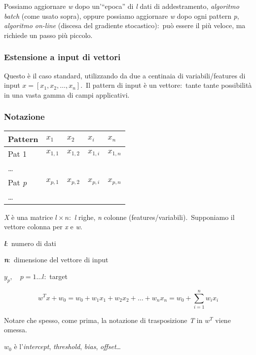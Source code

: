 \noindent Possiamo aggiornare \textit{w} dopo un'``epoca'' di \textit{l} dati di addestramento, \textit{algoritmo batch} (come usato sopra), oppure possiamo aggiornare \textit{w} dopo ogni pattern \textit{p}, \textit{algoritmo on-line} (discesa del gradiente stocastico):\ può essere il più veloce, ma richiede un passo più piccolo.\

\subsubsection{Estensione a input di vettori}

Questo è il caso standard, utilizzando da due a centinaia di variabili{\slash}features di input $x = [x_1, x_2, \dots, x_n]$.\
Il pattern di input è un vettore:\ tante tante possibilità in una vasta gamma di campi applicativi.\

\subsubsection{Notazione}

\begin{table}[H]
	\centering
	\begin{tabular}{|l||l|l|l|l|}
		\hline
		Pattern        & $x_1$     & $x_2$     & $x_i$     & $x_n$     \\\hline\hline
		Pat 1          & $x_{1,1}$ & $x_{1,2}$ & $x_{1,i}$ & $x_{1,n}$ \\\hline
		\dots          &           &           &           &           \\\hline
		Pat \textit{p} & $x_{p,1}$ & $x_{p,2}$ & $x_{p,i}$ & $x_{p,n}$ \\\hline
		\dots          &           &           &           &           \\\hline
	\end{tabular}
\end{table}

\textit{X} è una matrice $l \times n$:\ \textit{l} righe, \textit{n} colonne (features/variabili).\
Supponiamo il vettore colonna per \textit{x} e \textit{w}.\

\begin{flushleft}
	\textbf{\textit{l}}:\ numero di dati

	\textbf{\textit{n}}:\ dimensione del vettore di input

	$y_p, \quad p = 1\dots l$:\ target

	\[ w^Tx +w_0 = w_0 +w_1x_1 + w_2x_2 + \dots + w_nx_n = w_0 + \sum_{i=1}^n w_ix_i \]

	Notare che spesso, come prima, la notazione di trasposizione \textit{T} in $w^T$ viene omessa.

	$w_0$ è l'\textit{intercept}, \textit{threshold}, \textit{bias}, \textit{offset}\dots
\end{flushleft}

